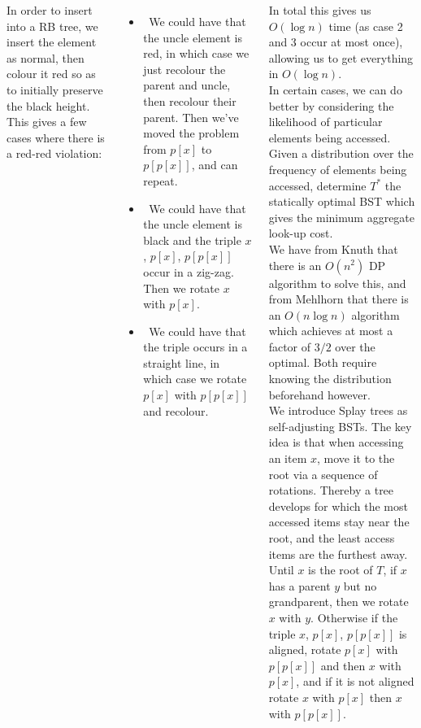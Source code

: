 \documentclass{tikzposter} %
\begin{document}
\begin{columns}
{{   In order to insert into a RB tree, we insert the element as normal, then colour it red so as to initially preserve the black height. This gives a few cases where there is a red-red violation:
   \begin{itemize}
           \item \ We could have that the uncle element is red, in which case we just recolour the parent and uncle, then recolour their parent. Then we've moved the problem from $p[x]$ to $p[p[x]]$, and can repeat.
           \item \ We could have that the uncle element is black and the triple $x$, $p[x]$, $p[p[x]]$ occur in a zig-zag. Then we rotate $x$ with $p[x]$.
           \item \ We could have that the triple occurs in a straight line, in which case we rotate $p[x]$ with $p[p[x]]$ and recolour.
   \end{itemize}

   In total this gives us $O(\log n)$ time (as case 2 and 3 occur at most once), allowing us to get everything in $O(\log n)$. \\

   In certain cases, we can do better by considering the likelihood of particular elements being accessed. Given a distribution over the frequency of elements being accessed, determine $T^{*}$ the statically optimal BST which gives the minimum aggregate look-up cost. \\

   We have from Knuth that there is an $O(n^{2})$ DP algorithm to solve this, and from Mehlhorn that there is an $O(n \log n)$ algorithm which achieves at most a factor of $3/2$ over the optimal. Both require knowing the distribution beforehand however. \\

   We introduce Splay trees as self-adjusting BSTs. The key idea is that when accessing an item $x$, move it to the root via a sequence of rotations. Thereby a tree develops for which the most accessed items stay near the root, and the least access items are the furthest away. \\

   Until $x$ is the root of $T$, if $x$ has a parent $y$ but no grandparent, then we rotate $x$ with $y$. Otherwise if the triple $x$, $p[x]$, $p[p[x]]$ is aligned, rotate $p[x]$ with $p[p[x]]$ and then $x$ with $p[x]$, and if it is not aligned rotate $x$ with $p[x]$ then $x$ with $p[p[x]]$. \\

}}
\end{columns}
\end{document}
